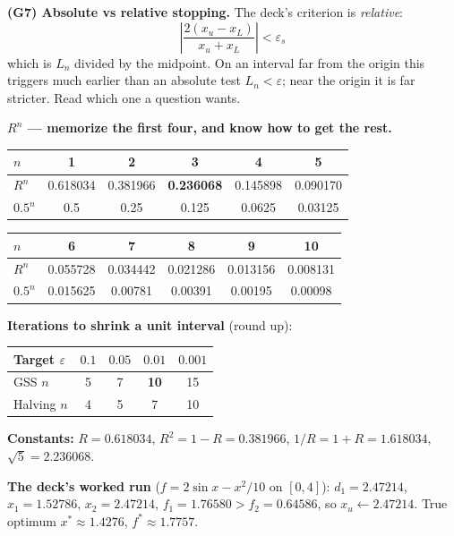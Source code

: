 \begin{derivedbox}
\smallskip
\textbf{(G7) Absolute vs relative stopping.} The deck's criterion is \emph{relative}:
\[
\left|\frac{2(x_u-x_L)}{x_u+x_L}\right| < \varepsilon_s
\]
which is $L_n$ divided by the midpoint. On an interval far from the origin this triggers much earlier than an absolute test $L_n<\varepsilon$; near the origin it is far stricter. Read which one a question wants.
\end{derivedbox}

\begin{numbox}
\textbf{$R^n$ --- memorize the first four, and know how to get the rest.}
\begin{center}\small
\begin{tabular}{@{}lccccc@{}}
\toprule
$n$ & 1 & 2 & 3 & 4 & 5\\
\midrule
$R^n$ & 0.618034 & 0.381966 & \textbf{0.236068} & 0.145898 & 0.090170\\
$0.5^n$ & 0.5 & 0.25 & 0.125 & 0.0625 & 0.03125\\
\bottomrule
\end{tabular}
\qquad
\begin{tabular}{@{}lccccc@{}}
\toprule
$n$ & 6 & 7 & 8 & 9 & 10\\
\midrule
$R^n$ & 0.055728 & 0.034442 & 0.021286 & 0.013156 & 0.008131\\
$0.5^n$ & 0.015625 & 0.00781 & 0.00391 & 0.00195 & 0.00098\\
\bottomrule
\end{tabular}
\end{center}

\textbf{Iterations to shrink a unit interval} (round up):
\begin{center}\small
\begin{tabular}{@{}lcccc@{}}
\toprule
Target $\varepsilon$ & $0.1$ & $0.05$ & $0.01$ & $0.001$\\
\midrule
GSS $n$ & 5 & 7 & \textbf{10} & 15\\
Halving $n$ & 4 & 5 & 7 & 10\\
\bottomrule
\end{tabular}
\end{center}

\textbf{Constants:} $R = 0.618034$, $R^2 = 1-R = 0.381966$, $1/R = 1+R = 1.618034$, $\sqrt5 = 2.236068$.

\textbf{The deck's worked run} ($f = 2\sin x - x^2/10$ on $[0,4]$): $d_1 = 2.47214$, $x_1 = 1.52786$, $x_2 = 2.47214$, $f_1 = 1.76580 > f_2 = 0.64586$, so $x_u \leftarrow 2.47214$. True optimum $x^\ast \approx 1.4276$, $f^\ast \approx 1.7757$.
\end{numbox}

